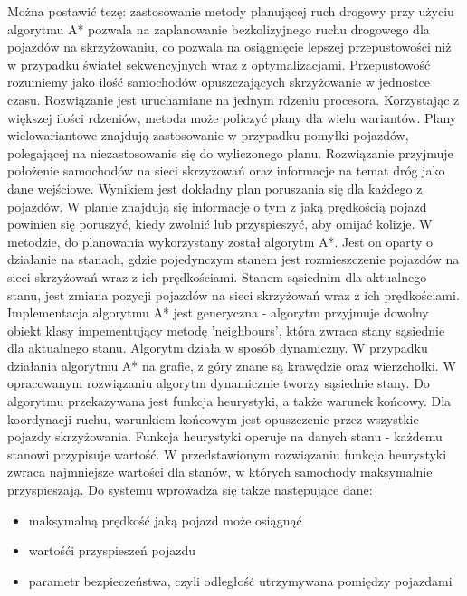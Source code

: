 Można postawić tezę: zastosowanie metody planującej ruch drogowy przy użyciu algorytmu A* pozwala na zaplanowanie bezkolizyjnego ruchu drogowego dla pojazdów na skrzyżowaniu, co pozwala na osiągnięcie lepszej przepustowości niż w przypadku świateł sekwencyjnych wraz z optymalizacjami. Przepustowość rozumiemy jako ilość samochodów opuszczających skrzyżowanie w jednostce czasu. Rozwiązanie jest uruchamiane na jednym rdzeniu procesora. Korzystając z większej ilości rdzeniów, metoda może policzyć plany dla wielu wariantów. Plany wielowariantowe znajdują zastosowanie w przypadku pomyłki pojazdów, polegającej na niezastosowanie się do wyliczonego planu.
\newline
\indent
Rozwiązanie przyjmuje położenie samochodów na sieci skrzyżowań oraz informacje na temat dróg jako dane wejściowe. Wynikiem jest dokładny plan poruszania się dla każdego z pojazdów. W planie znajdują się informacje o tym z jaką prędkością pojazd powinien się poruszyć, kiedy zwolnić lub przyspieszyć, aby omijać kolizje.
\newline
\indent
W metodzie, do planowania wykorzystany został algorytm A*. Jest on oparty o działanie na stanach, gdzie pojedynczym stanem jest rozmieszczenie pojazdów na sieci skrzyżowań wraz z ich prędkościami. Stanem sąsiednim dla aktualnego stanu, jest zmiana pozycji pojazdów na sieci skrzyżowań wraz z ich prędkościami. Implementacja algorytmu A* jest generyczna - algorytm przyjmuje dowolny obiekt klasy impementujący metodę 'neighbours', która zwraca stany sąsiednie dla aktualnego stanu. Algorytm działa w sposób dynamiczny. W przypadku działania algorytmu A* na grafie, z góry znane są krawędzie oraz wierzchołki. W opracowanym rozwiązaniu algorytm dynamicznie tworzy sąsiednie stany.
\newline
\indent
Do algorytmu przekazywana jest funkcja heurystyki, a także warunek końcowy. Dla koordynacji ruchu, warunkiem końcowym jest opuszczenie przez wszystkie pojazdy skrzyżowania. Funkcja heurystyki operuje na danych stanu - każdemu stanowi przypisuje wartość. W przedstawionym rozwiązaniu funkcja heurystyki zwraca najmniejsze wartości dla stanów, w których samochody maksymalnie przyspieszają.
\newline
\newline
\indent
Do systemu wprowadza się także następujące dane:
\begin{itemize}
\item maksymalną prędkość jaką pojazd może osiągnąć
\item wartośći przyspieszeń pojazdu
\item parametr bezpieczeństwa, czyli odległość utrzymywana pomiędzy pojazdami
\end{itemize}
